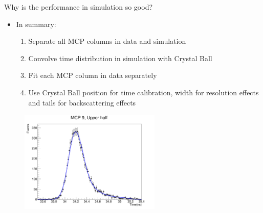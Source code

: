 \documentclass{beamer}
\begin{document}
\begin{frame}{Why is the performance in simulation so good?}
  \begin{itemize}
    \setlength\itemsep{0.0em}
    \item{In summary:}
    \begin{enumerate}
    \setlength\itemsep{0.0em}
      \item{Separate all MCP columns in data and simulation}
      \item{Convolve time distribution in simulation with Crystal Ball}
      \item{Fit each MCP column in data separately}
      \item{Use Crystal Ball position for time calibration, width for resolution effects and tails for backscattering effects}
    \end{enumerate}
  \end{itemize}
  \begin{figure}
    \centering
    \includegraphics[width = 0.6\textwidth]{Plots/Example_Time_alignment.png}
  \end{figure}
\end{frame}
\end{document}
